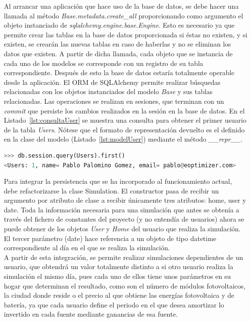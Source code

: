 Al arrancar una aplicación que hace uso de la base de datos, se debe hacer una llamada al método \textit{Base.metadata.create\_all} proporcionando como argumento el objeto instanciado de \textit{sqlalchemy.engine.base.Engine}. Esto es necesario ya que permite crear las tablas en la base de datos proporcionada si éstas no existen, y si existen, se crearán las nuevas tablas en caso de haberlas y no se eliminan los datos que existen. A partir de dicha llamada, cada objeto que se instancia de cada uno de los modelos se corresponde con un registro de su tabla correspondiente. Después de esto la base de datos estaría totalmente operable desde la aplicación. El ORM de SQLAlchemy permite realizar búsquedas relacionadas con los objetos instanciados del modelo \textit{Base} y sus tablas relacionadas. Las operaciones se realizan en sesiones, que terminan con un \textit{commit} que persiste los cambios realizados en la sesión en la base de datos. En el Listado~\ref{lst:consultaUser} se muestra una consulta para obtener el primer usuario de la tabla \textit{Users}. Nótese que el formato de representación devuelto es el definido en la clase del modelo (Listado~\ref{lst:modelUser}) mediante el método \textit{\_\_repr\_\_}.
\begin{lstlisting}[language=Python,float=ht,numbers=none,caption={Consulta para obtener el primer \textit{User}},label={lst:consultaUser}]
>>> db.session.query(Users).first()
<Users: 1, name= Pablo Palomino Gomez, email= pablo@eoptimizer.com>
\end{lstlisting}

Para integrar la persistencia que se ha incorporado al funcionamiento actual, debe refactorizarse la clase Simulation. El constructor pasa de recibir un argumento por atributo de clase a recibir únicamente tres atributos: home, user y date. Toda la información necesaria para una simulación que antes se obtenía a través del fichero de constantes del proyecto (y no entendía de usuarios) ahora se puede obtener de los objetos \textit{User} y \textit{Home} del usuario que realiza la simulación. El tercer parámetro (date) hace referencia a un objeto de tipo datetime correspondiente al día en el que se realiza la simulación.\\

A partir de esta integración, se permite realizar simulaciones dependientes de un usuario, que obtendrá un valor totalmente distinto a si otro usuario realiza la simulación el mismo día, pues cada uno de ellos tiene unos parámetros en su hogar que determinan el resultado, como son el número de módulos fotovoltaicos, la ciudad donde reside o el precio al que obtiene las energías fotovoltaica y de batería, ya que cada usuario define el periodo en el que desea amortizar lo invertido en cada fuente mediante ganancias de esa fuente.

